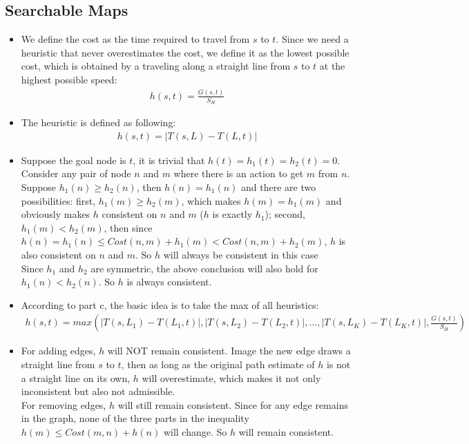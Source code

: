 \documentclass[11pt]{article}
\begin{document}
\begin{onehalfspace}
    \section{Searchable Maps}
    \begin{itemize}
        \item
        We define the cost as the time required to travel from $s$ to $t$. Since we need a heuristic that never overestimates the cost, we define it as the lowest possible cost, which is obtained by a traveling along a straight line from $s$ to $t$ at the highest possible speed: \\
        \begin{eqnarray*}
            h(s, t) = \frac{G(s, t)}{S_H}
        \end{eqnarray*}
        \item
        The heuristic is defined as following:
        \begin{eqnarray*}
            h(s, t) = |T(s, L) - T(L, t)|
        \end{eqnarray*}
        \item
        Suppose the goal node is $t$, it is trivial that $h(t) = h_1(t) = h_2(t) = 0$.
        Consider any pair of node $n$ and $m$ where there is an action to get $m$ from $n$. Suppose $h_1(n) \geq h_2(n)$, then $h(n) = h_1(n)$ and there are two possibilities: first, $h_1(m) \geq h_2(m)$, which makes $h(m) = h_1(m)$ and obviously makes $h$ consistent on $n$ and $m$ ($h$ is exactly $h_1$); second, $h_1(m) < h_2(m)$, then since $h(n) = h_1(n) \leq Cost(n,m) + h_1(m) < Cost(n,m) + h_2(m)$, $h$ is also consistent on $n$ and $m$. So $h$ will always be consistent in this case\\
        Since $h_1$ and $h_2$ are symmetric, the above conclusion will also hold for $h_1(n) < h_2(n)$. So $h$ is always consistent.
        \item According to part c, the basic idea is to take the max of all heuristics:
        \begin{eqnarray*}
            h(s, t) = max(|T(s, L_1) - T(L_1, t)|, |T(s, L_2) - T(L_2, t)|, ... , |T(s, L_K) - T(L_K, t)|, \frac{G(s, t)}{S_H})
        \end{eqnarray*}
        \item
        For adding edges, $h$ will NOT remain consistent. Image the new edge draws a straight line from $s$ to $t$, then as long as the original path estimate of $h$ is not a straight line on its own, $h$ will overestimate, which makes it not only inconsistent but also not admissible. \\
        For removing edges, $h$ will still remain consistent. Since for any edge remains in the graph, none of the three parts in the inequality $h(m) \leq Cost(m, n) + h(n)$ will change. So $h$ will remain consistent.
    \end{itemize}
    \newpage{}

\end{onehalfspace}
\end{document}
